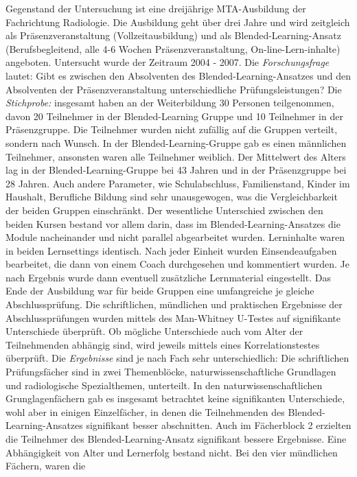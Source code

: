 Gegenstand der Untersuchung ist eine dreijährige MTA-Ausbildung der
Fachrichtung Radiologie. Die Ausbildung geht über drei Jahre und wird
zeitgleich als Präsenzveranstaltung (Vollzeitausbildung) und als
Blended-Learning-Ansatz (Berufsbegleitend, alle 4-6 Wochen
Präsenzveranstaltung, On-line-Lern-inhalte) angeboten. Untersucht wurde
der Zeitraum 2004 - 2007. Die \emph{Forschungsfrage} lautet: Gibt es
zwischen den Absolventen des Blended-Learning-Ansatzes und den
Absolventen der Präsenzveranstaltung unterschiedliche
Prüfungsleistungen? Die \emph{Stichprobe:} insgesamt haben an der
Weiterbildung 30 Personen teilgenommen, davon 20 Teilnehmer in der
Blended-Learning Gruppe und 10 Teilnehmer in der Präsenzgruppe. Die
Teilnehmer wurden nicht zufällig auf die Gruppen verteilt, sondern nach
Wunsch. In der Blended-Learning-Gruppe gab es einen männlichen
Teilnehmer, ansonsten waren alle Teilnehmer weiblich. Der Mittelwert des
Alters lag in der Blended-Learning-Gruppe bei 43 Jahren und in der
Präsenzgruppe bei 28 Jahren. Auch andere Parameter, wie Schulabschluss,
Familienstand, Kinder im Haushalt, Berufliche Bildung sind sehr
unausgewogen, was die Vergleichbarkeit der beiden Gruppen einschränkt.
Der wesentliche Unterschied zwischen den beiden Kursen bestand vor allem
darin, dass im Blended-Learning-Ansatzes die Module nacheinander und
nicht parallel abgearbeitet wurden. Lerninhalte waren in beiden
Lernsettings identisch. Nach jeder Einheit wurden Einsendeaufgaben
bearbeitet, die dann von einem Coach durchgesehen und kommentiert
wurden. Je nach Ergebnis wurde dann eventuell zusätzliche Lernmaterial
eingestellt. Das Ende der Ausbildung war für beide Gruppen eine
umfangreiche je gleiche Abschlussprüfung. Die schriftlichen, mündlichen
und praktischen Ergebnisse der Abschlussprüfungen wurden mittels des
Man-Whitney U-Testes auf signifikante Unterschiede überprüft. Ob
mögliche Unterschiede auch vom Alter der Teilnehmenden abhängig sind,
wird jeweils mittels eines Korrelationstestes überprüft. Die
\emph{Ergebnisse} sind je nach Fach sehr unterschiedlich: Die
schriftlichen Prüfungsfächer sind in zwei Themenblöcke,
naturwissenschaftliche Grundlagen und radiologische Spezialthemen,
unterteilt. In den naturwissenschaftlichen Grunglagenfächern gab es
insgesamt betrachtet keine signifikanten Unterschiede, wohl aber in
einigen Einzelfächer, in denen die Teilnehmenden des
Blended-Learning-Ansatzes signifikant besser abschnitten. Auch im
Fächerblock 2 erzielten die Teilnehmer des Blended-Learning-Ansatz
signifikant bessere Ergebnisse. Eine Abhängigkeit von Alter und
Lernerfolg bestand nicht. Bei den vier mündlichen Fächern, waren die
